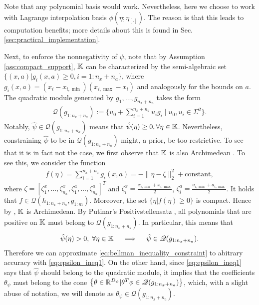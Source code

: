 \begin{remark}\label{remark:using-interpolation}
Note that any polynomial basis would work. Nevertheless, here we choose to work with Lagrange interpolation basis $\phi(\eta;\eta_{[\cdot]})$. The reason is that this leads to computation benefits; more details about this is found in Sec. \ref{sec:practical_implementation}.
\end{remark}

Next, to enforce the nonnegativity of $\hat{\psi}$, note that by Assumption \ref{ass:compact_support}, $\mathbb{K}$ can be characterized by the semi-algebraic set $\{(x,a)|g_i(x,a)\ge 0,i=1:n_x+n_a\}$, where $g_i(x,a)= (x_i-x_{i,\min})(x_{i,\max}-x_i)$ and analogously for the bounds on $a$.
The quadratic module \citep[Eq.~3.13]{laurent2009sums} generated by $g_1,\ldots,g_{n_x+n_a}$ takes the form
\begin{align*}
\mathscr{Q}(g_{1:n_x+n_a})\!:=\!\{u_0\!+\!\!\!\sum_{i=1}^{n_x+n_a}\!\!u_i g_i \mid u_0,u_i\!\in\!\Sigma^2\}.
\end{align*}
Notably, $\hat{\psi}\in \mathscr{Q}(g_{1:n_x+n_a})$ means that $\hat{\psi}(\eta)\ge 0,\forall \eta\in\mathbb{K}$.
Nevertheless, constraining $\hat{\psi}$ to be in $\mathscr{Q}(g_{1:n_x+n_a})$ might, a prior, be too restrictive. To see that it is in fact not the case, we first observe that $\mathbb{K}$ is also Archimedean \citep[Def.~3.18]{laurent2009sums}. To see this, we consider the function 
\begin{align*}
f(\eta) = \sum_{i=1}^{n_x+n_a}g_i(x,a)=-\|\eta-\zeta\|_2^2+\mbox{constant},
\end{align*}
where $\zeta = [\zeta_1^x,\ldots,\zeta_{n_x}^x,\zeta_{1}^a,\ldots,\zeta_{n_a}^a]^T$ and $\zeta_i^x = \frac{x_{i,\min}+x_{i,\max}}{2}$,  $\zeta_i^a = \frac{a_{i,\min}+a_{i,\max}}{2}$. It holds that $f\in\mathscr{Q}(h_{1:n_x+n_a},g_{1:m})$. Moreover, the set $\{\eta|f(\eta)\ge 0\}$ is compact. Hence by \citep[Thm.~3.17, Def.~3.18]{laurent2009sums}, $\mathbb{K}$ is Archimedean. 
By Putinar's Positivstellensatz \citep{putinar1993positive}\citep[Thm.~3.20]{laurent2009sums}, all polynomials that are positive on $\mathbb{K}$ must belong to $\mathscr{Q}(g_{1:n_x+n_a})$.
In particular, this means that 
\begin{align}
\hat{\psi}(\eta)> 0, \; \forall \eta\in \mathbb{K} \quad
\implies \quad \hat{\psi}\in\mathscr{Q}(g_{1:n_x+n_a}).\label{eq:epsilon_ineq1}
\end{align}
Therefore we can approximate \eqref{eq:bellman_inequality_constraint} to abitrary accuracy with \eqref{eq:epsilon_ineq1}. 
On the other hand, since \eqref{eq:epsilon_ineq1} says that $\hat{\psi}$ should belong to the quadratic module, it implies that the coefficients $\theta_\psi$ must belong to the cone $\left\{\theta\in\mathbb{R}^{D_\psi}|\theta^T\phi\in \mathscr{Q}(g_{1:n_x+n_a})\right\}$, which, with a slight abuse of notation, we will denote as $\theta_\psi \in \mathscr{Q}(g_{1:n_x+n_a})$.

